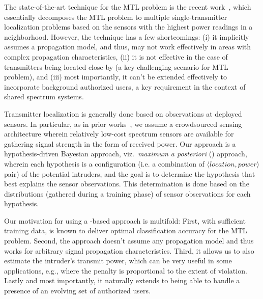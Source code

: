 The state-of-the-art technique for the MTL problem is the recent
work~\cite{mobicom17-splot}, which essentially decomposes the MTL
problem to multiple single-transmitter localization problems based on
the sensors with the highest power readings in a
neighborhood.  However, the technique has
a few shortcomings: (i) it implicitly assumes a propagation model, and
thus, may not work effectively in areas with complex propagation
characteristics, (ii) it is not effective in the case of transmitters
being located close-by (a key challenging scenario for MTL problem),
and (iii) most importantly, it can't be extended effectively to
incorporate background authorized users, a key requirement in the
context of shared spectrum systems. 

  Transmitter localization is generally done based
on observations at deployed sensors. In particular, as in prior
works~\cite{mobicom17-splot,chakraborty2017specsense}, we assume a
crowdsourced sensing architecture wherein relatively low-cost spectrum
sensors are available for gathering signal strength in the form of
received power. Our approach is a hypothesis-driven Bayesian approach,
viz.\ {\em maximum a posteriori} (\map) approach, wherein each
hypothesis is a configuration (i.e.  a combination of $\langle
location, power \rangle$ pair) of the potential intruders, and the
goal is to determine the hypothesis that best explains the sensor
observations. This determination is done based on the distributions
(gathered during a training phase) of sensor observations for each
hypothesis.


  Our motivation for using a \map-based
approach is multifold: First, with sufficient training data, \map is
known to deliver optimal classification accuracy for the MTL problem.
Second, the \map approach doesn't assume any propagation model and
thus works for arbitrary signal propagation characteristics. Third, it
allows us to also estimate the intruder's transmit power, which can be
very useful in some applications, e.g., where the penalty is
proportional to the extent of violation. Lastly and most importantly,
it naturally extends to being able to handle a presence of an evolving
set of authorized users.

